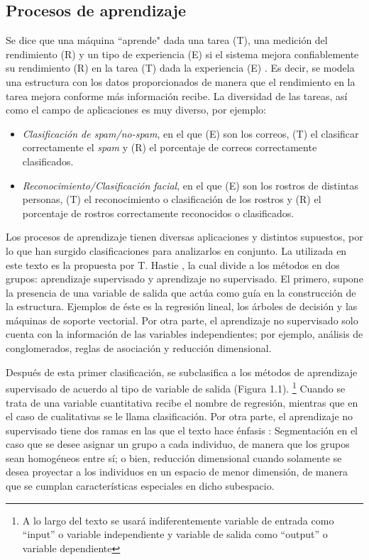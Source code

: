 \subsection{Procesos de aprendizaje}

Se dice que una máquina ``aprende" dada una tarea (T), una medición del rendimiento (R) y un tipo de experiencia (E) si el sistema mejora confiablemente su rendimiento (R) en la tarea (T) dada la experiencia (E) \cite{mitchell2006discipline}. Es decir, se modela una estructura con los datos proporcionados de manera que el rendimiento en la tarea mejora conforme más información recibe. La diversidad de las tareas, así como el campo de aplicaciones es muy diverso, por ejemplo:

\begin{itemize} 

\item \textit{Clasificación de spam/no-spam}, en el que (E) son los correos, (T) el clasificar correctamente el \textit{spam} y (R) el porcentaje de correos correctamente clasificados.

\item \textit{Reconocimiento/Clasificación facial}, en el que (E) son los rostros de distintas personas, (T) el reconocimiento o clasificación de los rostros y (R) el porcentaje de rostros correctamente reconocidos o clasificados.
\end{itemize} 

Los procesos de aprendizaje tienen diversas aplicaciones y distintos supuestos, por lo que han surgido clasificaciones para analizarlos en conjunto. La utilizada en este texto es la propuesta por T. Hastie \cite{hastie2009elements}, la cual divide a los métodos en dos grupos: aprendizaje supervisado y aprendizaje no supervisado. El primero, supone la presencia de una variable de salida que actúa como guía en la construcción de la estructura. Ejemplos de éste es la regresión lineal, los árboles de decisión y las máquinas de soporte vectorial. 
Por otra parte, el aprendizaje no supervisado solo cuenta con la información de las variables independientes; por ejemplo, análisis de conglomerados, reglas de asociación y reducción dimensional. 

Después de esta primer clasificación, se subclasifica a los métodos de aprendizaje supervisado de acuerdo al tipo de variable de salida (Figura 1.1). \footnote{A lo largo del texto se usará indiferentemente variable de entrada como ``input'' o variable independiente y variable de salida como ``output'' o variable dependiente} Cuando se trata de una variable cuantitativa recibe el nombre de regresión, mientras que en el caso de cualitativas se le llama clasificación. Por otra parte, el aprendizaje no supervisado tiene dos ramas en las que el texto hace énfasis \cite{hastie2009elements}: Segmentación en el caso que se desee asignar un grupo a cada individuo, de manera que los grupos sean homogéneos entre sí; o bien, reducción dimensional cuando solamente se desea proyectar a los individuos en un espacio de menor dimensión, de manera que se cumplan características especiales en dicho subespacio. 

